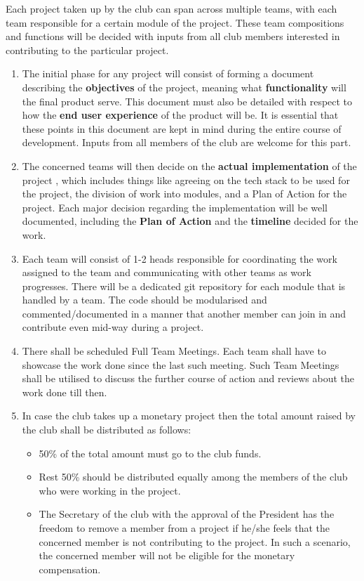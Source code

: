 \documentclass[11pt]{report}
\makeatletter
\newcommand{\bb}[1]{\textbf{#1}}
\renewcommand{\chapter}{\@startsection{chapter}{1}{0mm}{\baselineskip}{0.5\baselineskip}{\centering\sc\large}}
\makeatother
\begin{document}
\chapter{Team Guidelines}
      Each project taken up by the club can span across multiple teams, with each team responsible for a certain module of the project. These team compositions and functions will be decided with inputs from all club members interested in contributing to the particular project. 
      \begin{enumerate}
            \item The initial phase for any project will consist of forming a document describing the \bb{objectives} of the project, meaning what \bb{functionality} will the final product serve. This document must also be detailed with respect to how the \bb{end user experience} of the product will be. It is essential that these points in this document are kept in mind during the entire course of development. Inputs from all members of the club are welcome for this part. 
            \item The concerned teams will then decide on the \bb{actual implementation} of the project , which includes things like agreeing on the tech stack to be used for the project, the division of work into modules, and a Plan of Action  for the project. Each major decision regarding the implementation will be well documented, including the \bb{Plan of Action} and the \bb{timeline} decided for the work.
            \item Each team will consist of 1-2 heads responsible for coordinating the work assigned to the team and communicating with other teams as work progresses. There will be a dedicated git repository for each module that is handled by a team. The code should be modularised and commented/documented in a manner that another member can join in and contribute even mid-way during a project.
            \item There shall be scheduled Full Team Meetings. Each team shall have to showcase the work done since the last such meeting. Such Team Meetings shall be utilised to discuss the further course of action and reviews about the work done till then.
            \item In case the club takes up a monetary project then the total amount raised by the club shall be distributed as follows:
                  \begin{itemize}
                        \item 50\% of the total amount must go to the club funds.
                        \item Rest 50\% should be distributed equally among the members of the club who were working in the project.
                        \item The Secretary of the club with the approval of the President has the freedom to remove a member from a project if he/she feels that the concerned member is not contributing to the project. In such a scenario, the concerned member will not be eligible for the monetary compensation.
                  \end{itemize}
      \end{enumerate}
      
\end{document}
